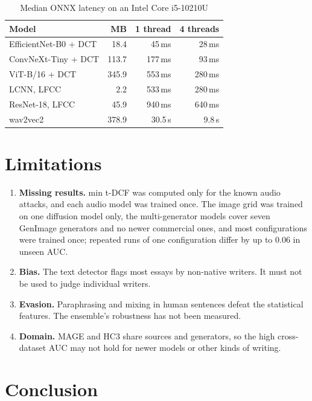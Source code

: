\documentclass[conference]{IEEEtran}
\begin{document}
\begin{table}[t]
\centering
\caption{Median ONNX latency on an Intel Core i5-10210U}
\label{tab:latency}
\begin{tabular}{lrrr}
\toprule
\textbf{Model} & \textbf{MB} & \textbf{1 thread} & \textbf{4 threads} \\
\midrule
EfficientNet-B0 + DCT & 18.4 & 45\,ms & 28\,ms \\
ConvNeXt-Tiny + DCT & 113.7 & 177\,ms & 93\,ms \\
ViT-B/16 + DCT & 345.9 & 553\,ms & 280\,ms \\
\midrule
LCNN, LFCC & 2.2 & 533\,ms & 280\,ms \\
ResNet-18, LFCC & 45.9 & 940\,ms & 640\,ms \\
wav2vec2 & 378.9 & 30.5\,s & 9.8\,s \\
\bottomrule
\end{tabular}
\end{table}

\section{Limitations}

\begin{enumerate}
    \item \textbf{Missing results.} min t-DCF was computed only for the known audio attacks, and each audio model was trained once. The image grid was trained on one diffusion model only, the multi-generator models cover seven GenImage generators and no newer commercial ones, and most configurations were trained once; repeated runs of one configuration differ by up to 0.06 in unseen AUC.
    \item \textbf{Bias.} The text detector flags most essays by non-native writers. It must not be used to judge individual writers.
    \item \textbf{Evasion.} Paraphrasing and mixing in human sentences defeat the statistical features. The ensemble's robustness has not been measured.
    \item \textbf{Domain.} MAGE and HC3 share sources and generators, so the high cross-dataset AUC may not hold for newer models or other kinds of writing.
\end{enumerate}

\section{Conclusion}
\end{document}
